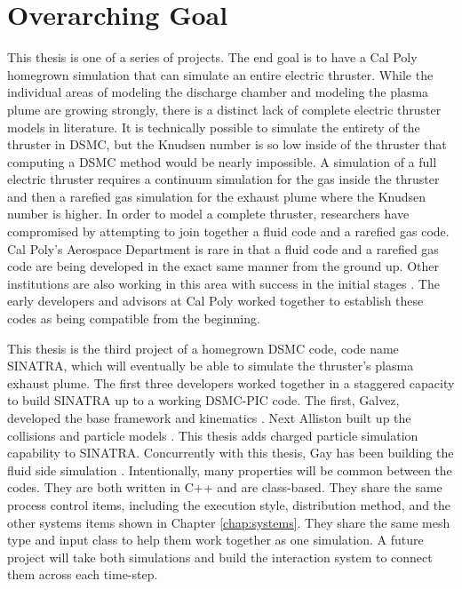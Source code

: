 




\section{Overarching Goal}
This thesis is one of a series of projects. The end goal is to have a Cal Poly homegrown simulation that can simulate an entire electric thruster. While the individual areas of modeling the discharge chamber \cite{discharge} and modeling the plasma plume \cite{justplume} are growing strongly, there is a distinct lack of complete electric thruster models in literature. It is technically possible to simulate the entirety of the thruster in DSMC, but the Knudsen number is so low inside of the thruster that computing a DSMC method would be nearly impossible. A simulation of a full electric thruster requires a continuum simulation for the gas inside the thruster and then a rarefied gas simulation for the exhaust plume where the Knudsen number is higher. In order to model a complete thruster, researchers have compromised by attempting to join together a fluid code and a rarefied gas code. Cal Poly's Aerospace Department is rare in that a fluid code and a rarefied gas code are being developed in the exact same manner from the ground up. Other institutions are also working in this area with success in the initial stages \cite{afrl,afrl_copy}. The early developers and advisors at Cal Poly worked together to establish these codes as being compatible from the beginning. \par

\indent This thesis is the third project of a homegrown DSMC code, code name SINATRA, which will eventually be able to simulate the thruster's plasma exhaust plume. The first three developers worked together in a staggered capacity to build SINATRA up to a working DSMC-PIC code. The first, Galvez, developed the base framework and kinematics \cite{Galvez2018a}. Next Alliston built up the collisions and particle models \cite{mac_thesis}. This thesis adds charged particle simulation capability to SINATRA. Concurrently with this thesis, Gay has been building the fluid side simulation \cite{Gay}. Intentionally, many properties will be common between the codes. They are both written in C++ and are class-based. They share the same process control items, including the execution style, distribution method, and the other systems items shown in Chapter \ref{chap:systems}. They share the same mesh type and input class to help them work together as one simulation. A future project will take both simulations and build the interaction system to connect them across each time-step.
